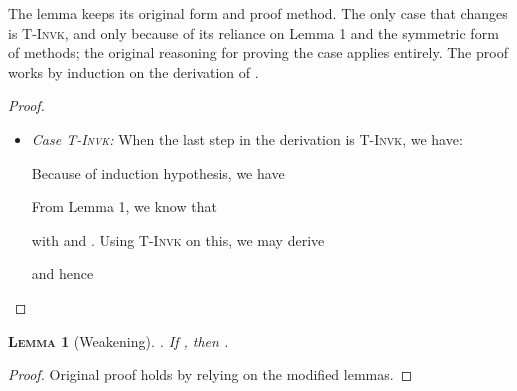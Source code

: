 \documentclass[11pt]{article}
\newtheorem{lemma}{\textsc{Lemma}}[section]
\begin{document}
\noindent The lemma keeps its original form and proof method. The only case that changes is \textsc{T-Invk}, and only because of its reliance on Lemma 1 and the symmetric form of methods; the original reasoning for proving the case applies entirely. The proof  works by induction on the derivation of .

\begin{proof} 
	
\begin{itemize}
	
\noindent We state only the case for \textsc{T-Invk}:
	
\item \emph{Case \textsc{T-Invk}:}
When the last step in the derivation is \textsc{T-Invk}, we have:
 {}

\noindent Because of induction hypothesis, we have 


\noindent From Lemma 1, we know that 


\noindent with  and . Using \textsc{T-Invk} on this, we may derive


\noindent and hence


\end{itemize}

\end{proof}


\begin{lemma}[Weakening]. If , then . 
\end{lemma}

\begin{proof}
Original proof holds by relying on the modified lemmas. 
\end{proof}

\medskip
\end{document}
